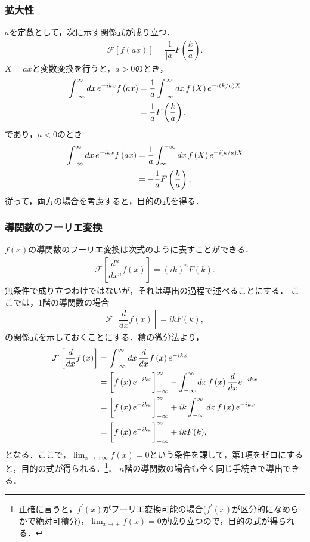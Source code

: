 \subsubsection{拡大性}
%
$a$を定数として，次に示す関係式が成り立つ．
\begin{align}
 \mathcal{F}\left[f\left(ax\right)\right] = \dfrac{1}{\left|a\right|}F\left(\dfrac{k}{a}\right). 
\end{align}
%
$X=ax$と変数変換を行うと，$a>0$のとき，
\begin{align}
 \int_{-\infty}^{\infty}dx\,e^{-ikx}f\left(ax\right) 
 & = \dfrac{1}{a} \int_{-\infty}^{\infty}dx\,f\left(X\right)e^{-i(k/a)X} \notag \\
 & = \dfrac{1}{a}F\left(\dfrac{k}{a}\right),
\end{align}
であり，$a<0$のとき
\begin{align}
 \int_{-\infty}^{\infty}dx\,e^{-ikx}f\left(ax\right) 
 & = \dfrac{1}{a} \int_{\infty}^{-\infty}dx\,f\left(X\right)e^{-i(k/a)X} \notag \\
 & = -\dfrac{1}{a}F\left(\dfrac{k}{a}\right),
\end{align}
従って，両方の場合を考慮すると，目的の式を得る．
%
\subsubsection{導関数のフーリエ変換}
%
$f(x)$の導関数のフーリエ変換は次式のように表すことができる．
\begin{align}
  \mathcal{F}\left[\dfrac{d^n}{dx^n}f\left(x\right)\right] = \left(ik\right)^{n} F\left(k\right). \label{deriv_fourier} 
\end{align}
無条件で成り立つわけではないが，それは導出の過程で述べることにする．
ここでは，1階の導関数の場合
\begin{align}
 \mathcal{F}\left[\dfrac{d}{dx}f\left(x\right)\right] = ik F\left(k\right),
\end{align}
の関係式を示しておくことにする．積の微分法より，
%
\begin{align}
 \mathcal{F}\left[\dfrac{d}{dx}f\left(x\right)\right] 
 &= \int_{-\infty}^{\infty}dx\,\dfrac{d}{dx}f\left(x\right)e^{-ikx} \notag \\
 &= \biggl[f\left(x\right)e^{-ikx}\biggr]_{-\infty}^{\infty} - \int_{-\infty}^{\infty}dx\,f\left(x\right)\dfrac{d}{dx}e^{-ikx} \notag \\ 
 &= \biggl[f\left(x\right)e^{-ikx}\biggr]_{-\infty}^{\infty} + ik \int_{-\infty}^{\infty}dx\,f\left(x\right)e^{-ikx} \notag \\
 &= \biggl[f\left(x\right)e^{-ikx}\biggr]_{-\infty}^{\infty} + ik F(k), 
\end{align}
となる．ここで，$\displaystyle\lim_{x\to \pm \infty}f\left(x\right)=0$という条件を課して，第1項をゼロにすると，目的の式が得られる．\footnote{正確に言うと，$f^{\prime}(x)$がフーリエ変換可能の場合($f^{\prime}(x)$が区分的になめらかで絶対可積分)，$\displaystyle\lim_{x\to \pm}f(x) = 0$が成り立つので，目的の式が得られる．}．
$n$階の導関数の場合も全く同じ手続きで導出できる．

